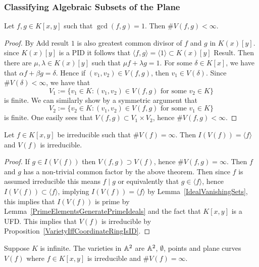 \subsubsection{Classifying Algebraic Subsets of the Plane}
\begin{theorem}\label{BezoutForCurves}
    Let $f,g\in K[x,y]$ such that $\gcd(f,g)=1$. Then $\#V(f,g) < \infty$.
\end{theorem}
\begin{proof}
    By {\LARGE Add result} $1$ is also greatest common divisor of $f$ and $g$ in $K(x)[y]$. since $K(x)[y]$ is a PID it follows that $\langle f,g\rangle = \langle 1\rangle\subset K(x)[y]$ {\LARGE Result}. Then there are $\mu,\lambda \in K(x)[y]$ such that $\mu f + \lambda g = 1$. For some $\delta\in K[x]$, we have that $\alpha f+ \beta g = \delta$. Hence if $(v_1,v_2)\in V(f,g)$, then $v_1\in V(\delta)$. Since $\#V(\delta) < \infty$, we have that 
    $$V_1 := \{v_1\in K : (v_1,v_2)\in V(f,g) \text{ for some } v_2\in K\}$$
    is finite. We can similarly show by a symmetric argument that 
    $$V_2 := \{v_2\in K : (v_1,v_2)\in V(f,g) \text{ for some } v_1\in K\}$$
    is finite.
    One easily sees that $V(f,g)\subset V_1\times V_2$, hence $\#V(f,g) <\infty$.  
\end{proof}
\begin{corollary}\label{InfiniteVanishingSetOfIrredublePolynomialIsVariety}
    Let $f\in K[x,y]$ be irreducible such that $\#V(f)=\infty$. Then $I(V(f))=\langle f\rangle$ and $V(f)$ is irreducible. 
\end{corollary}
\begin{proof}
    If $g\in I(V(f))$ then $V(f,g)\supset V(f)$, hence $\#V(f,g) = \infty$. Then $f$ and $g$ has a non-trivial common factor by the above theorem. Then since $f$ is assumed irreducible this means $f\mid g$ or equivalently that $g\in \langle f\rangle$, hence $I(V(f))\subset \langle f\rangle$, implying $I(V(f)) = \langle f\rangle$ by Lemma~\ref{IdealVanishingSets}, this implies that $I(V(f))$ is prime by Lemma~\ref{PrimeElementsGeneratePrimeIdeals} and the fact that $K[x,y]$ is a UFD. This implies that $V(f)$ is irreducible by Proposition~\ref{VarietyIffCoordinateRingIsID}.
\end{proof}
\begin{corollary}\label{ClassificationOfAlgebraicSetsInThePlaneOverInfiniteFields}
    Suppose $K$ is infinite. The varieties in $\mathbb{A}^2$ are $\mathbb{A}^2$, $\emptyset$, points and plane curves $V(f)$ where $f\in K[x,y]$ is irreducible and $\#V(f)=\infty$.
\end{corollary}
